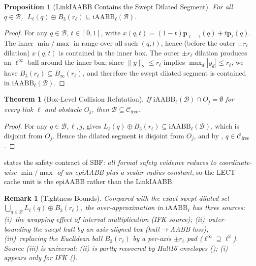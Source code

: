 \documentclass[journal]{IEEEtran}
\newtheorem{theorem}{Theorem}
\newtheorem{proposition}{Proposition}
\newtheorem{remark}{Remark}
\newcommand{\iAABB}{\mathrm{iAABB}}
\newcommand{\Cfree}{\mathcal{C}_{\mathrm{free}}}
\begin{document}
\begin{proposition}[LinkIAABB Contains the Swept Dilated Segment]
\label{prop:iaabb_contains}
For all $q\in\mathcal{B}$,
$\;L_\ell(q)\oplus B_3(r_\ell) \subseteq \iAABB_\ell(\mathcal{B})$.
\end{proposition}

\begin{proof}
For any $q\in\mathcal{B},\,t\in[0,1]$, write
$x(q,t) = (1-t)\bm{p}_{\ell-1}(q)+t\bm{p}_\ell(q)$. The inner $\min/\max$
in  range over all such $(q,t)$, hence (before the outer
$\pm r_\ell$ dilation) $x(q,t)$ is contained in the inner box. The outer
$\pm r_\ell$ dilation produces an $\ell^\infty$-ball around the inner
box; since $\|y\|_2\le r_\ell$ implies $\max_d|y_d|\le r_\ell$, we have
$B_3(r_\ell)\subseteq B_\infty(r_\ell)$, and therefore the swept dilated
segment is contained in $\iAABB_\ell(\mathcal{B})$.
\end{proof}

\begin{theorem}[Box-Level Collision Refutation]\label{thm:certify}
If $\iAABB_\ell(\mathcal{B})\cap O_j = \emptyset$ for every link $\ell$
and obstacle $O_j$, then $\mathcal{B}\subseteq\Cfree$.
\end{theorem}

\begin{proof}
For any $q\in\mathcal{B},\ell,j$,  gives
$L_\ell(q)\oplus B_3(r_\ell)\subseteq \iAABB_\ell(\mathcal{B})$, which
is disjoint from $O_j$. Hence the dilated segment is disjoint from
$O_j$, and by , $q\in\Cfree$.
\end{proof}

 states the safety contract of SBF: \emph{all formal
safety evidence reduces to coordinate-wise $\min/\max$ of an epiAABB
plus a scalar radius constant}, so the LECT cache unit is the epiAABB
rather than the LinkIAABB.

\begin{remark}[Tightness Bounds]\label{rem:tightness}
Compared with the exact swept dilated set
$\bigcup_{q\in\mathcal{B}} L_\ell(q)\oplus B_3(r_\ell)$, the
over-approximation in $\iAABB_\ell$ has three sources:
(i)~the \emph{wrapping effect} of interval multiplication (IFK source);
(ii)~outer-bounding the swept hull by an axis-aligned box (hull$\to$AABB
loss); (iii)~replacing the Euclidean ball $B_3(r_\ell)$ by a per-axis
$\pm r_\ell$ pad ($\ell^\infty\!\supseteq\!\ell^2$). Source (iii) is
universal; (ii) is partly recovered by Hull16 envelopes
(); (i) appears only for IFK
().
\end{remark}
\end{document}
